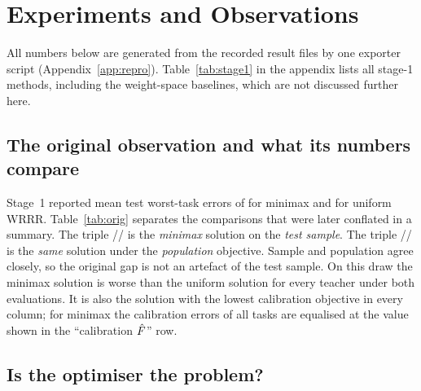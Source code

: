 \section{Experiments and Observations}
\label{sec:exp}

All numbers below are generated from the recorded result files by one exporter script
(Appendix~\ref{app:repro}). Table~\ref{tab:stage1} in the appendix lists all stage-1 methods,
including the weight-space baselines, which are not discussed further here.

\subsection{The original observation and what its numbers compare}
\label{sec:orig}

\begin{table}[t]
\caption{The original calibration draw of each teacher, stage 1 and stage 2. Each column is one
teacher. The same fitted matrix is evaluated three ways: the test sample (seen during development),
the exact population objective $F$, and the calibration objective $\Fhat$ it was fitted on. The
stage-1 and stage-2 fits are bit-identical (matching SHA-256 of the merged matrices).}
\label{tab:orig}
\centering\small

\end{table}

Stage~1 reported mean test worst-task errors of \SOneMinimaxTestWorstMean{} for minimax and
\SOneUniformTestWorstMean{} for uniform WRRR. Table~\ref{tab:orig} separates the comparisons that
were later conflated in a summary. The triple \SOneMinimaxTestWorstSeedA/\SOneMinimaxTestWorstSeedB/%
\SOneMinimaxTestWorstSeedC{} is the \emph{minimax} solution on the \emph{test sample}. The triple
\STwoOrigMinimaxPopTA/\STwoOrigMinimaxPopTB/\STwoOrigMinimaxPopTC{} is the \emph{same} solution
under the \emph{population} objective. Sample and population agree closely, so the original gap is
not an artefact of the test sample. On this draw the minimax solution is worse than the uniform
solution for every teacher under both evaluations. It is also the solution with the lowest
calibration objective in every column; for minimax the calibration errors of all tasks are
equalised at the value shown in the ``calibration $\Fhat$'' row.

\subsection{Is the optimiser the problem?}

